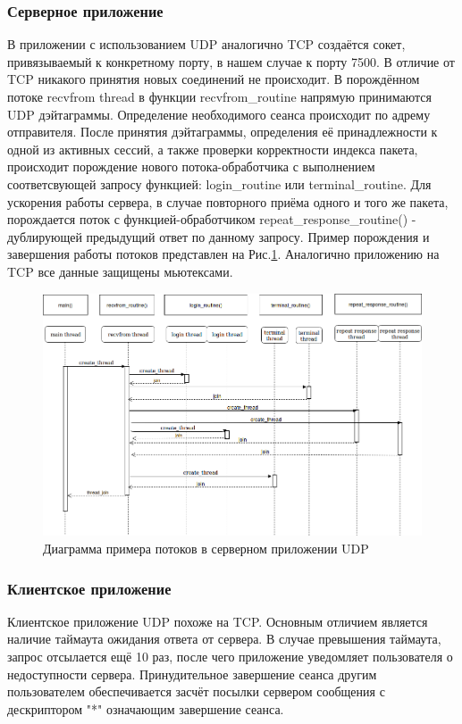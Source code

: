 \subsubsection{Серверное приложение}

В приложении с использованием UDP аналогично TCP создаётся сокет, привязываемый к конкретному порту, в нашем случае к порту 7500. В отличие от TCP никакого принятия новых соединений не происходит. В порождённом потоке recvfrom thread в функции recvfrom_routine напрямую принимаются UDP дэйтаграммы. Определение необходимого сеанса происходит по адрему отправителя. После принятия дэйтаграммы, определения её принадлежности к одной из активных сессий, а также проверки корректности индекса пакета, происходит порождение нового потока-обработчика с выполнением соответсвующей запросу функцией: login_routine или terminal_routine. Для ускорения работы сервера, в случае повторного приёма одного и того же пакета, порождается поток с функцией-обработчиком repeat_response_routine() - дублирующей предыдущий ответ по данному запросу. Пример порождения и завершения работы потоков представлен на Рис.\ref{udp_thr}. Аналогично приложению на TCP все данные защищены мьютексами.

\begin{figure}[H]
\centering
\includegraphics[width=1\textwidth]{pics/udpthread.png}
\caption{Диаграмма примера потоков в серверном приложении UDP}
\label{udp_thr}
\end{figure}
\subsubsection{Клиентское приложение}
Клиентское приложение UDP похоже на TCP. Основным отличием является наличие таймаута ожидания ответа от сервера. В случае превышения таймаута, запрос отсылается ещё 10 раз, после чего приложение уведомляет пользователя о недоступности сервера. Принудительное завершение сеанса другим пользователем обеспечивается засчёт посылки сервером сообщения с дескриптором "*" означающим завершение сеанса.

